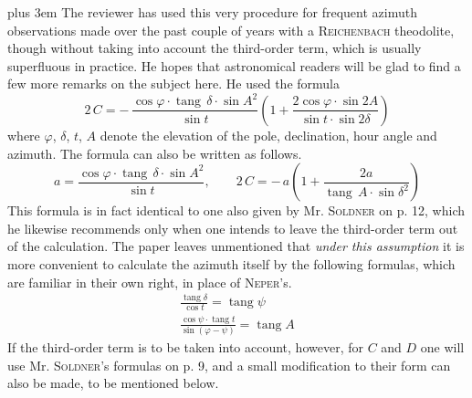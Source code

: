 \begingroup\rightskip=0pt plus 3em
The reviewer has used this very procedure for frequent azimuth observations made over the past couple of years with a \textsc{Reichenbach} theodolite, though without taking into account the third-order term, which is usually superfluous in practice. He hopes that astronomical readers will be glad to find a few more remarks on the subject here. He used the formula
\[
2\,C = -\,\frac{\cos\varphi\cdot \operatorname{tang}\,\delta\cdot \sin A^2}{\sin t}
\left(1 + \frac{2\cos\varphi\cdot \sin 2A}{\sin t\cdot \sin 2\delta}\right)
\]
where $\varphi$, $\delta$, $t$, $A$ denote the elevation of the pole, declination, hour angle and azimuth. The formula can also be written as follows.
\[
a = \frac{\cos\varphi\cdot \operatorname{tang}\,\delta\cdot \sin A^2}{\sin t}, \qquad
2\,C = -\,a\left(1 + \frac{2a}{\operatorname{tang}\,A\cdot \sin\delta^2}\right)
\]
This formula is in fact identical to one also given by Mr. \textsc{Soldner} on p. 12, which he likewise recommends only when one intends to leave the third-order term out of the calculation. The paper leaves unmentioned that \emph{under this assumption} it is more convenient to calculate the azimuth itself by the following formulas, which are familiar in their own right, in place of \textsc{Neper}'s.
\[
\begin{gathered}
\frac{\operatorname{tang}\delta}{\cos t}=\operatorname{tang}\psi\\[5pt]
\frac{\cos\psi\cdot\operatorname{tang}t}{\sin(\varphi-\psi)}=\operatorname{tang}A
\end{gathered}
\]
If the third-order term is to be taken into account, however, for $C$ and $D$ one will use Mr. \textsc{Soldner}'s formulas on p. 9, and a small modification to their form can also be made, to be mentioned below.\par\endgroup

